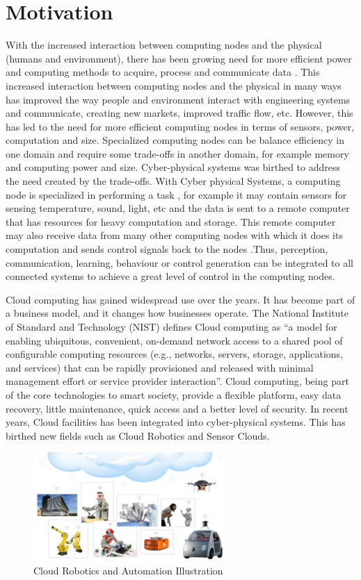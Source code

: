 \documentclass[english]{lni}
\begin{document}
\section{Motivation}
With the increased interaction between computing nodes and the physical (humans and environment), there has been growing need for more efficient power and computing methods to acquire, process and communicate data \cite{c3}. This increased interaction between computing nodes and the physical in many ways has improved the way people and environment interact with engineering systems and communicate, creating new markets, improved traffic flow, etc. However, this has led to the need for more efficient computing nodes in terms of sensors, power, computation and size. Specialized computing nodes can be balance efficiency in one domain and require some trade-offs in another domain, for example memory and computing power and size. Cyber-physical systems was birthed to address the need created by the trade-offs. With Cyber physical Systems, a computing node is specialized in performing a task \cite{a7}, for example it may contain sensors for sensing temperature, sound, light, etc and the data is sent to a remote computer that has resources for heavy computation and storage. This remote computer may also receive data from many other computing nodes with which it does its computation and sends control signals back to the nodes \cite{a7}.Thus, perception, communication, learning, behaviour or control generation can be integrated to all connected systems to achieve a great level of control in the computing nodes.

Cloud computing has gained widespread use over the years. It has become part of a business model, and it changes how businesses operate. The National Institute of Standard and Technology (NIST) defines Cloud computing as “a model for enabling ubiquitous, convenient, on-demand network access to a shared pool of configurable computing resources (e.g., networks, servers, storage, applications, and services) that can be rapidly provisioned and released with minimal management effort or service provider interaction”\cite{nist_ref}. Cloud computing, being part of the core technologies to smart society, provide a flexible platform, easy data recovery, little maintenance, quick access and a better level of security.
In recent years, Cloud facilities has been integrated into cyber-physical systems. This has birthed new fields such as Cloud Robotics and Sensor Clouds. 

\begin{figure}[ht]
    \centering
    \includegraphics[width=0.65\textwidth]{Images/CloudRobotics.png}
    \caption{Cloud Robotics and Automation Illustration \cite{image1}}
    \label{fig:CloudRobtics}
\end{figure}
\end{document}
